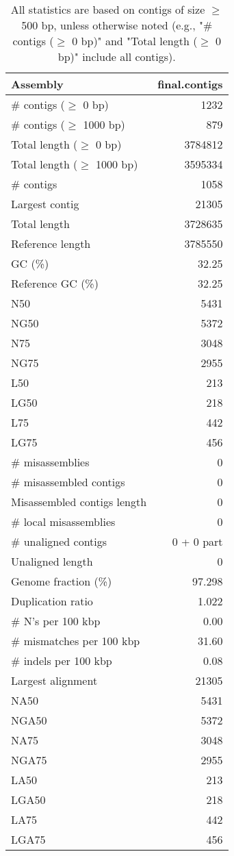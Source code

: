 \documentclass[12pt,a4paper]{article}
\begin{document}
\begin{table}[ht]
\begin{center}
\caption{All statistics are based on contigs of size $\geq$ 500 bp, unless otherwise noted (e.g., "\# contigs ($\geq$ 0 bp)" and "Total length ($\geq$ 0 bp)" include all contigs).}
\begin{tabular}{|l*{1}{|r}|}
\hline
Assembly & final.contigs \\ \hline
\# contigs ($\geq$ 0 bp) & 1232 \\ \hline
\# contigs ($\geq$ 1000 bp) & 879 \\ \hline
Total length ($\geq$ 0 bp) & 3784812 \\ \hline
Total length ($\geq$ 1000 bp) & 3595334 \\ \hline
\# contigs & 1058 \\ \hline
Largest contig & 21305 \\ \hline
Total length & 3728635 \\ \hline
Reference length & 3785550 \\ \hline
GC (\%) & 32.25 \\ \hline
Reference GC (\%) & 32.25 \\ \hline
N50 & 5431 \\ \hline
NG50 & 5372 \\ \hline
N75 & 3048 \\ \hline
NG75 & 2955 \\ \hline
L50 & 213 \\ \hline
LG50 & 218 \\ \hline
L75 & 442 \\ \hline
LG75 & 456 \\ \hline
\# misassemblies & 0 \\ \hline
\# misassembled contigs & 0 \\ \hline
Misassembled contigs length & 0 \\ \hline
\# local misassemblies & 0 \\ \hline
\# unaligned contigs & 0 + 0 part \\ \hline
Unaligned length & 0 \\ \hline
Genome fraction (\%) & 97.298 \\ \hline
Duplication ratio & 1.022 \\ \hline
\# N's per 100 kbp & 0.00 \\ \hline
\# mismatches per 100 kbp & 31.60 \\ \hline
\# indels per 100 kbp & 0.08 \\ \hline
Largest alignment & 21305 \\ \hline
NA50 & 5431 \\ \hline
NGA50 & 5372 \\ \hline
NA75 & 3048 \\ \hline
NGA75 & 2955 \\ \hline
LA50 & 213 \\ \hline
LGA50 & 218 \\ \hline
LA75 & 442 \\ \hline
LGA75 & 456 \\ \hline
\end{tabular}
\end{center}
\end{table}
\end{document}
